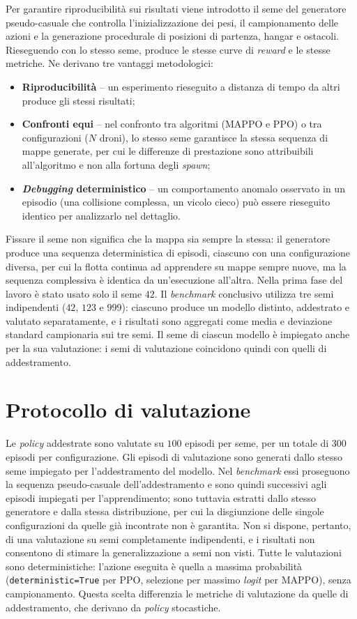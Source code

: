 \documentclass[12pt,a4paper,twoside]{report}
\begin{document}
Per garantire riproducibilità sui risultati viene introdotto il seme del generatore pseudo-casuale che controlla l'inizializzazione dei pesi, il campionamento delle azioni e la generazione procedurale di posizioni di partenza, hangar e ostacoli. Rieseguendo con lo stesso seme, produce le stesse curve di \emph{reward} e le stesse metriche. Ne derivano tre vantaggi metodologici:
\begin{itemize}
    \item \textbf{Riproducibilità} -- un esperimento rieseguito a distanza di tempo da altri produce gli stessi risultati;
    \item \textbf{Confronti equi} -- nel confronto tra algoritmi (MAPPO e PPO) o tra configurazioni ($N$ droni), lo stesso seme garantisce la stessa sequenza di mappe generate, per cui le differenze di prestazione sono attribuibili all'algoritmo e non alla fortuna degli \emph{spawn};
    \item \textbf{\emph{Debugging} deterministico} -- un comportamento anomalo osservato in un episodio (una collisione complessa, un vicolo cieco) può essere rieseguito identico per analizzarlo nel dettaglio.
\end{itemize}
\newpage
Fissare il seme non significa che la mappa sia sempre la stessa: il generatore produce una sequenza deterministica di episodi, ciascuno con una configurazione diversa, per cui la flotta continua ad apprendere su mappe sempre nuove, ma la sequenza complessiva è identica da un'esecuzione all'altra. Nella prima fase del lavoro è stato usato solo il seme $42$. Il \emph{benchmark} conclusivo utilizza tre semi indipendenti ($42$, $123$ e $999$): ciascuno produce un modello distinto, addestrato e valutato separatamente, e i risultati sono aggregati come media e deviazione standard campionaria sui tre semi. Il seme di ciascun modello è impiegato anche per la sua valutazione: i semi di valutazione coincidono quindi con quelli di addestramento.

\section{Protocollo di valutazione}
\label{sec:protocollo_valutazione}

Le \emph{policy} addestrate sono valutate su $100$ episodi per seme, per un totale di $300$ episodi per configurazione. Gli episodi di valutazione sono generati dallo stesso seme impiegato per l'addestramento del modello. Nel \emph{benchmark} essi proseguono la sequenza pseudo-casuale dell'addestramento e sono quindi successivi agli episodi impiegati per l'apprendimento; sono tuttavia estratti dallo stesso generatore e dalla stessa distribuzione, per cui la disgiunzione delle singole configurazioni da quelle già incontrate non è garantita. Non si dispone, pertanto, di una valutazione su semi completamente indipendenti, e i risultati non consentono di stimare la generalizzazione a semi non visti. Tutte le valutazioni sono deterministiche: l'azione eseguita è quella a massima probabilità (\texttt{deterministic=True} per PPO, selezione per massimo \emph{logit} per MAPPO), senza campionamento. Questa scelta differenzia le metriche di valutazione da quelle di addestramento, che derivano da \emph{policy} stocastiche.
\end{document}
